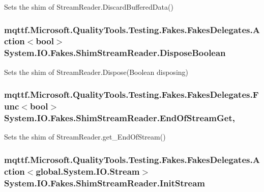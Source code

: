 Sets the shim of Stream\-Reader.\-Discard\-Buffered\-Data()

\hypertarget{class_system_1_1_i_o_1_1_fakes_1_1_shim_stream_reader_a1b8fc9d7f4de230c2ffa181dba94e392}{
\subsubsection[{Dispose\-Boolean}]{\setlength{\rightskip}{0pt plus 5cm}mqttf.\-Microsoft.\-Quality\-Tools.\-Testing.\-Fakes.\-Fakes\-Delegates.\-Action$<$bool$>$ System.\-I\-O.\-Fakes.\-Shim\-Stream\-Reader.\-Dispose\-Boolean\hspace{0.3cm}{\ttfamily [set]}}}\label{class_system_1_1_i_o_1_1_fakes_1_1_shim_stream_reader_a1b8fc9d7f4de230c2ffa181dba94e392}


Sets the shim of Stream\-Reader.\-Dispose(\-Boolean disposing)

\hypertarget{class_system_1_1_i_o_1_1_fakes_1_1_shim_stream_reader_a9805d309d2e7959a18ec6e1a0eadf68c}{
\subsubsection[{End\-Of\-Stream\-Get}]{\setlength{\rightskip}{0pt plus 5cm}mqttf.\-Microsoft.\-Quality\-Tools.\-Testing.\-Fakes.\-Fakes\-Delegates.\-Func$<$bool$>$ System.\-I\-O.\-Fakes.\-Shim\-Stream\-Reader.\-End\-Of\-Stream\-Get\hspace{0.3cm}{\ttfamily [get]}, {\ttfamily [set]}}}\label{class_system_1_1_i_o_1_1_fakes_1_1_shim_stream_reader_a9805d309d2e7959a18ec6e1a0eadf68c}


Sets the shim of Stream\-Reader.\-get\-\_\-\-End\-Of\-Stream()

\hypertarget{class_system_1_1_i_o_1_1_fakes_1_1_shim_stream_reader_a21ffd7bf965297d91080af0d119c0b4c}{
\subsubsection[{Init\-Stream}]{\setlength{\rightskip}{0pt plus 5cm}mqttf.\-Microsoft.\-Quality\-Tools.\-Testing.\-Fakes.\-Fakes\-Delegates.\-Action$<$global.\-System.\-I\-O.\-Stream$>$ System.\-I\-O.\-Fakes.\-Shim\-Stream\-Reader.\-Init\-Stream\hspace{0.3cm}{\ttfamily [set]}}}\label{class_system_1_1_i_o_1_1_fakes_1_1_shim_stream_reader_a21ffd7bf965297d91080af0d119c0b4c}



